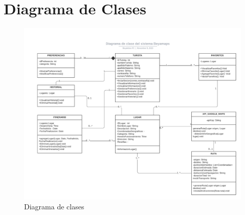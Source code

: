 \section{Diagrama de Clases}
   \begin{figure}[htbp]
        \centering
        \includegraphics[width=16.5cm]{casos de uso/DiagramaClases/BEYAMAPS.png}
        \caption{Diagrama de clases}
        \label{fig:enter-label}
    \end{figure}